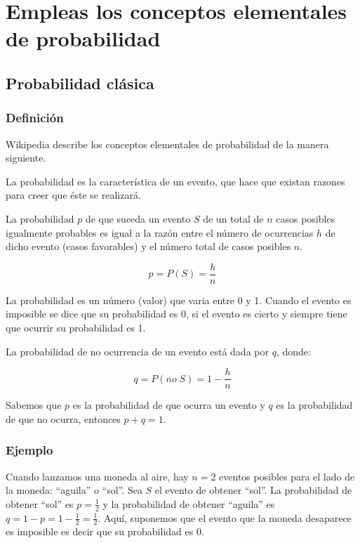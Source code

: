 \chapter{Empleas los conceptos elementales de probabilidad}

\section{Probabilidad clásica}

\subsection{Definición}

Wikipedia describe los conceptos elementales de probabilidad de la manera
siguiente.

La probabilidad es la característica de un evento, que hace que existan razones
para creer que éste se realizará.

La probabilidad $p$ de que suceda un evento $S$ de un total de $n$ casos
posibles igualmente probables es igual a la razón entre el número de
ocurrencias $h$ de dicho evento (casos favorables) y el número total de casos
posibles $n$.

$$
p=P\left(S\right)=\frac {h}{n}
$$

La probabilidad es un número (valor) que varia entre 0 y 1. Cuando el evento es
imposible se dice que su probabilidad es 0, si el evento es cierto y siempre
tiene que ocurrir su probabilidad es 1.

La probabilidad de no ocurrencia de un evento está dada por $q$, donde:

$$
q=P\left(no \; S\right)=1-\frac {h}{n}
$$

Sabemos que $p$ es la probabilidad de que ocurra un evento y $q$ es la
probabilidad de que no ocurra, entonces $p + q = 1$.

\subsection{Ejemplo}

Cuando lanzamos una moneda al aire, hay $n=2$ eventos posibles para el
lado de la moneda: ``aguila'' o ``sol''. Sea $S$ el evento de obtener ``sol''.
La probabilidad de obtener ``sol'' es $p = \frac{1}{2}$ y la probabilidad
de obtener ``aguila'' es $q = 1 - p = 1 - \frac{1}{2} = \frac{1}{2}$.
Aquí, suponemos que el evento que la moneda desaparece es imposible
es decir que su probabilidad es $0$.

